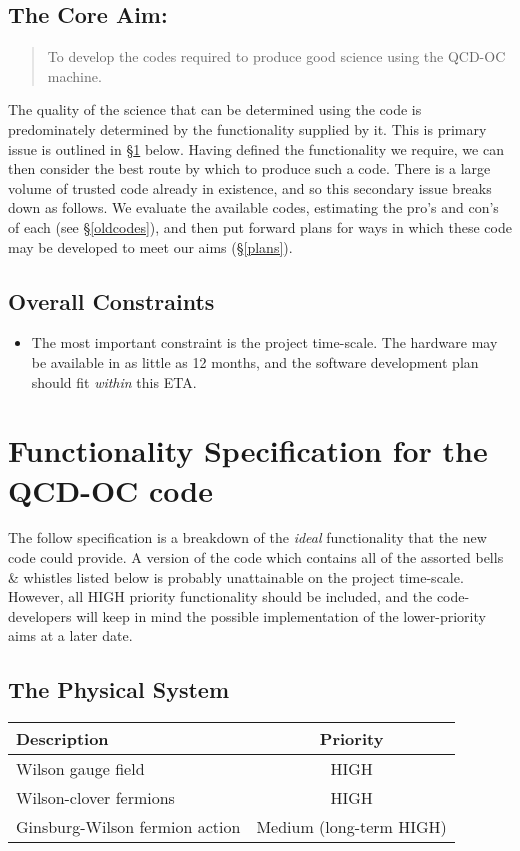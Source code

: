 \documentclass[12pt]{article}
\begin{document}
\subsection*{The Core Aim:}
\begin{quote}
To develop the codes required to produce good science using the QCD-OC
machine.
\end{quote}

The quality of the science that can be determined using the code is
predominately determined by the functionality supplied by it.  This is
primary issue is outlined in \S\ref{codefunc} below.  Having defined
the functionality we require, we can then consider the best route by
which to produce such a code.  There is a large volume of trusted code
already in existence, and so this secondary issue breaks down as
follows.  We evaluate the available codes, estimating the pro's and
con's of each (see \S\ref{oldcodes}), and then put forward plans for
ways in which these code may be developed to meet our aims
(\S\ref{plans}).

\subsection*{Overall Constraints}
\begin{itemize}
\item The most important constraint is the project time-scale.  The
hardware may be available in as little as 12 months, and the software
development plan should fit \emph{within} this ETA.
\end{itemize}

\section{Functionality Specification for the QCD-OC code}
\label{codefunc}
The follow specification is a breakdown of the \emph{ideal}
functionality that the new code could provide.  A version of the code
which contains all of the assorted bells \& whistles listed below is
probably unattainable on the project time-scale.  However, all HIGH
priority functionality should be included, and the code-developers
will keep in mind the possible implementation of the lower-priority
aims at a later date.

\subsection{The Physical System}
\begin{center}
 \begin{tabular}{lc}
 \hline
 \bf{Description} & \bf{Priority}\\
 \hline
  Wilson gauge field & HIGH \\
  Wilson-clover fermions & HIGH \\
  Ginsburg-Wilson fermion action & Medium (long-term HIGH)\\
 \hline
 \end{tabular}
\end{center}
\end{document}
